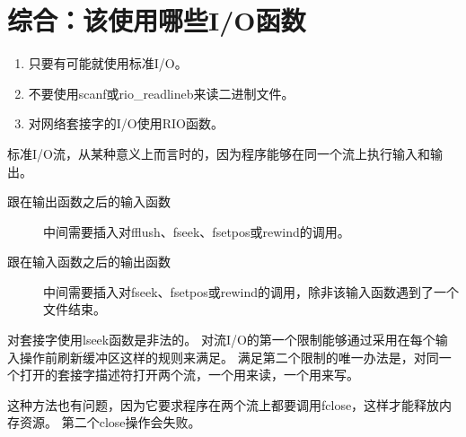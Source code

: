 
\section{综合：该使用哪些I/O函数}
{
    \begin{enumerate}
        \item 只要有可能就使用标准I/O。
        \item 不要使用scanf或rio\_readlineb来读二进制文件。
        \item 对网络套接字的I/O使用RIO函数。
    \end{enumerate}

    标准I/O流，从某种意义上而言时的，因为程序能够在同一个流上执行输入和输出。

    \begin{description}
        \item[跟在输出函数之后的输入函数] 中间需要插入对fflush、fseek、fsetpos或rewind的调用。
        \item[跟在输入函数之后的输出函数] 中间需要插入对fseek、fsetpos或rewind的调用，除非该输入函数遇到了一个文件结束。
    \end{description}

    对套接字使用lseek函数是非法的。
    对流I/O的第一个限制能够通过采用在每个输入操作前刷新缓冲区这样的规则来满足。
    满足第二个限制的唯一办法是，对同一个打开的套接字描述符打开两个流，一个用来读，一个用来写。

    这种方法也有问题，因为它要求程序在两个流上都要调用fclose，这样才能释放内存资源。
    第二个close操作会失败。
}
